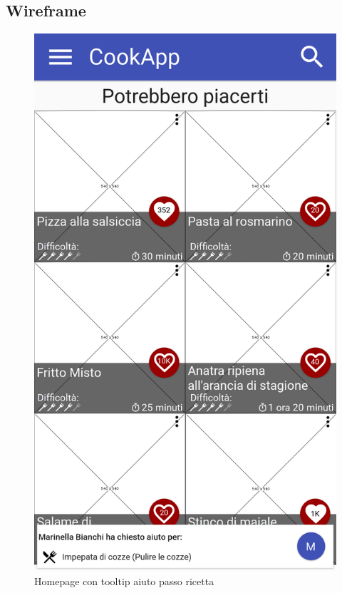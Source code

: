 \subsection{Wireframe}
\begin{figure}[H]
	\begin{minipage}{.49\textwidth}
		\includegraphics[width=\textwidth]{img/wireframe/homepage_aiuto_passo_ricetta.png}
		\caption{Homepage con tooltip aiuto passo ricetta}
		\label{fig:homepage_tooltip}
	\end{minipage}

\end{figure}
